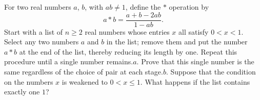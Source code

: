 For two real numbers $ a$,  $ b$,  with $ ab\neq 1$,  define the $ \ast$ operation by\[ a\ast b=\frac{a+b-2ab}{1-ab}.\] Start with a list of $ n\geq 2$ real numbers whose entries $ x$ all satisfy $ 0<x<1$. Select any two numbers $ a$ and $ b$ in the list; remove them and put the number $ a\ast b$ at the end of the list, thereby reducing its length by one. Repeat this procedure until a single number remains.$ a.$ Prove that this single number is the same regardless of the choice of pair at each stage.$ b.$ Suppose that the condition on the numbers $ x$ is weakened to $ 0<x\leq 1$. What happens if the list contains exactly one $ 1$?